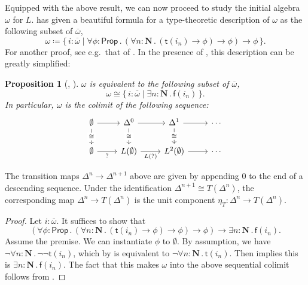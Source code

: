 \documentclass[a4paper,12pt]{amsart}
\newtheorem{proposition}[theorem]{Proposition}
\theoremstyle{definition}
\newcommand{\mb}[1]{\mathbf{#1}}
\newcommand{\ms}[1]{\mathsf{#1}}
\newcommand{\ov}[1]{\overline{#1}}
\newcommand{\scomp}[2]{\{\,#1\mid#2\,\}}
\newcommand{\prth}[1]{\left(#1\right)}
\newcommand{\N}{\mb N}
\newcommand{\fa}[2]{\forall #1\!\colon\!\!#2\mathpunct{.}}
\newcommand{\ex}[2]{\exists #1\!\colon\!\!#2\mathpunct{.}}
\newcommand{\emp}{\emptyset}
\newcommand{\pp}{\ms{Prop}}
\newcommand\istsym{\ms{t}}
\newcommand\isfsym{\ms{f}}
\newcommand\ist[1]{\istsym(#1)}
\newcommand\isf[1]{\isfsym(#1)}
\begin{document}
Equipped with the above result, we can now proceed to study the initial algebra $\omega$ for $L$. \citet{JIBLADZE1997185} has given a beautiful formula for a type-theoretic description of $\omega$ as the following subset of $\ov\omega$, 
\[ \omega \coloneq \scomp{i : \ov\omega}{\fa\phi{\pp} (\fa n{\N} (\ist{i_n} \to \phi) \to \phi) \to \phi}\text{.} \]
For another proof, see e.g.\ that of \citet{VANOOSTEN2000233}. In the presence of , this description can be greatly simplified:

\begin{proposition}[\AxiomNT, \AxiomSQCC]\label{prop:omegacolimit}
  $\omega$ is equivalent to the following subset of $\ov\omega$,
  \[ \omega \cong \scomp{i : \ov\omega}{\ex n{\N} \isf{i_n}}\text{.} \]
  In particular, $\omega$ is the colimit of the following sequence:
    \[\begin{tikzcd}
    \emp & {\Delta^0} & {\Delta^1} & \cdots \\
    \emp & {L(\emp)} & {L^2(\emp)} & \cdots
    \arrow[from=1-1, to=1-2]
    \arrow["\cong"{description}, from=1-1, to=2-1]
    \arrow[from=1-2, to=1-3]
    \arrow["\cong"{description}, from=1-2, to=2-2]
    \arrow[from=1-3, to=1-4]
    \arrow["\cong"{description}, from=1-3, to=2-3]
    \arrow["{?}"', from=2-1, to=2-2]
    \arrow["{L(?)}"', from=2-2, to=2-3]
    \arrow[from=2-3, to=2-4]
  \end{tikzcd}\]
\end{proposition}

The transition maps $\Delta^n\to \Delta^{n+1}$ above are given by appending $0$ to the end of a descending sequence. Under the identification $\Delta^{n+1}\cong T(\Delta^n)$, the corresponding map $\Delta^n\to T(\Delta^n)$ is the unit component $\eta_T\colon \Delta^n\to T(\Delta^{n})$.

\begin{proof}
  Let $i : \ov\omega$. It suffices to show that
  \[ \prth{\fa\phi{\pp} (\fa n{\N} (\ist{i_n} \to \phi) \to \phi) \to \phi} \to \ex{n}\N \isf{i_n}\text{.} \]
  Assume the premise. We can instantiate $\phi$ to $\emp$. By assumption, we have $\neg\fa n\N \neg\neg\ist{i_n}$, which by  is equivalent to $\neg\fa n\N \ist{i_n}$. Then  implies this is $\ex n\N \isf{i_n}$. The fact that this makes $\omega$ into the above sequential colimit follows from \citet[Cor.~1.10]{VANOOSTEN2000233}.
\end{proof}
\end{document}
